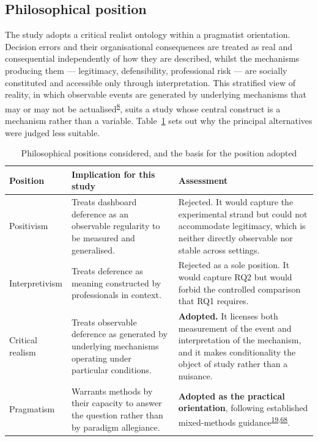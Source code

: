 \documentclass[11pt,a4paper]{article}
\numberwithin{figure}{section}
\numberwithin{table}{section}
\begin{document}
\subsection{Philosophical position}

The study adopts a critical realist ontology within a pragmatist orientation. Decision errors and their
organisational consequences are treated as real and consequential independently of how they are described,
whilst the mechanisms producing them --- legitimacy, defensibility, professional risk --- are socially
constituted and accessible only through interpretation. This stratified view of reality, in which
observable events are generated by underlying mechanisms that may or may not be
actualised\textsuperscript{\hyperlink{ref8}{8}}, suits a study whose central construct is a mechanism rather than a variable.
Table~\ref{tab:phil} sets out why the principal alternatives were judged less suitable.

\begin{table}[H]
\centering\footnotesize
\caption{Philosophical positions considered, and the basis for the position adopted}
\label{tab:phil}
\begin{tabularx}{\textwidth}{@{}p{2.5cm} X p{4.6cm}@{}}
\toprule
\textbf{Position} & \textbf{Implication for this study} & \textbf{Assessment} \\
\midrule
Positivism & Treats dashboard deference as an observable regularity to be measured and generalised. &
Rejected. It would capture the experimental strand but could not accommodate legitimacy, which is neither
directly observable nor stable across settings. \\
Interpretivism & Treats deference as meaning constructed by professionals in context. & Rejected as a sole
position. It would capture RQ2 but would forbid the controlled comparison that RQ1 requires. \\
Critical realism & Treats observable deference as generated by underlying mechanisms operating under
particular conditions. & \textbf{Adopted.} It licenses both measurement of the event and interpretation of
the mechanism, and it makes conditionality the object of study rather than a nuisance. \\
Pragmatism & Warrants methods by their capacity to answer the question rather than by paradigm allegiance.
& \textbf{Adopted as the practical orientation}, following established mixed-methods
guidance\textsuperscript{\hyperlink{ref19}{19},\hyperlink{ref68}{68}}. \\
\bottomrule
\end{tabularx}
\end{table}
\end{document}
